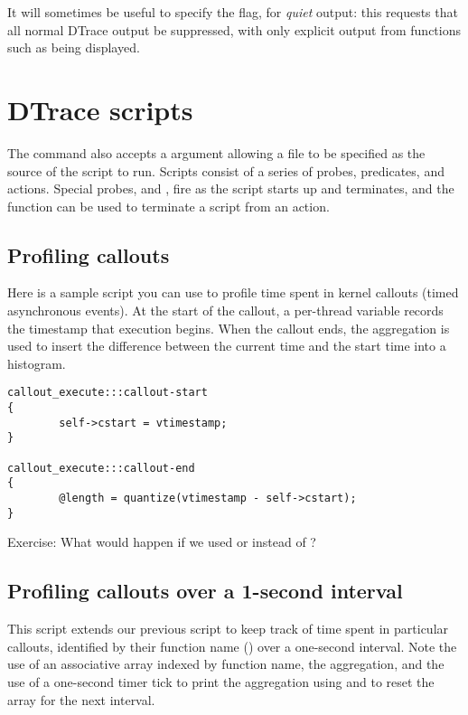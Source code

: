 \documentclass[a4paper,10pt]{article}
\begin{document}
\noindent
It will sometimes be useful to specify the  flag, for \textit{quiet}
output: this requests that all normal DTrace output be suppressed, with only
explicit output from functions such as  being displayed.

\section*{DTrace scripts}

The  command also accepts a  argument allowing a
file to be specified as the source of the script to run.
Scripts consist of a series of probes, predicates, and actions.
Special probes,  and , fire as the script starts up
and terminates, and the function  can be used to terminate a
script from an action.

\subsection*{Profiling callouts}

Here is a sample script you can use to profile time spent in kernel callouts
(timed asynchronous events).
At the start of the callout, a per-thread variable  records the
timestamp that execution begins.
When the callout ends, the  aggregation is used to insert the
difference between the current time and the start time into a histogram.

\begin{small}
\begin{verbatim}
callout_execute:::callout-start
{
        self->cstart = vtimestamp;
}

callout_execute:::callout-end
{
        @length = quantize(vtimestamp - self->cstart);
}
\end{verbatim}
\end{small}

\noindent
Exercise: What would happen if we used  or
 instead of ?

\subsection*{Profiling callouts over a 1-second interval}

This script extends our previous script to keep track of time spent in
particular callouts, identified by their function name
() over a one-second interval.
Note the use of an associative array indexed by function name, the
 aggregation, and the use of a one-second timer tick to 
print the aggregation using  and  to reset the
array for the next interval.
\end{document}
